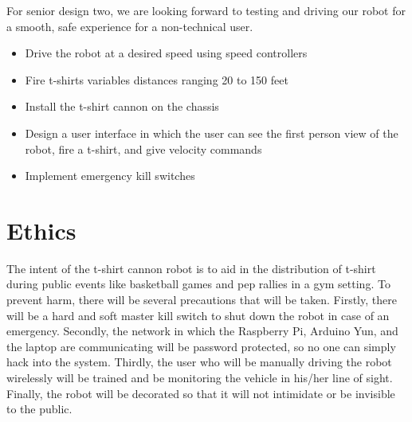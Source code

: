 \documentclass[letterpaper,12pt]{article}
\begin{document}
\noindent For senior design two, we are looking forward to testing and driving our robot for a smooth, safe experience for a non-technical user.
\begin{itemize}
    \item Drive the robot at a desired speed using speed controllers
    \item Fire t-shirts variables distances ranging 20 to 150 feet
    \item Install the t-shirt cannon on the chassis
    \item Design a user interface in which the user can see the first person view of the robot, fire a t-shirt, and give velocity commands
    \item Implement emergency kill switches
\end{itemize}

\section{Ethics}
\noindent The intent of the t-shirt cannon robot is to aid in the distribution of t-shirt during public events like basketball games and pep rallies in a gym setting. To prevent harm, there will be several precautions that will be taken. Firstly, there will be a hard and soft master kill switch to shut down the robot in case of an emergency. Secondly, the network in which the Raspberry Pi, Arduino Yun, and the laptop are communicating will be password protected, so no one can simply hack into the system. Thirdly, the user who will be manually driving the robot wirelessly will be trained and be monitoring the vehicle in his/her line of sight. Finally, the robot will be decorated so that it will not intimidate or be invisible to the public. 
\end{document}

